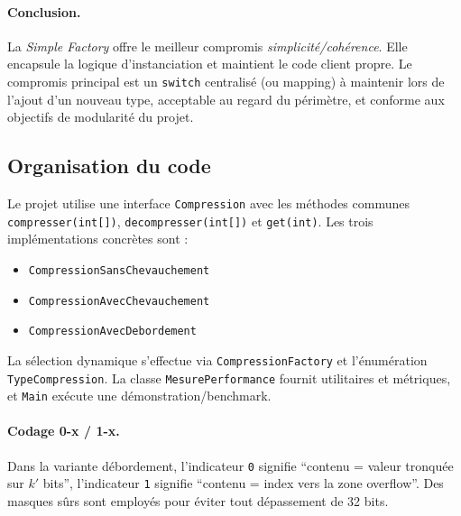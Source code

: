 \paragraph{Conclusion.} La \emph{Simple Factory} offre le meilleur compromis \emph{simplicité/cohérence}. Elle encapsule la logique d'instanciation et maintient le code client propre. Le compromis principal est un \texttt{switch} centralisé (ou mapping) à maintenir lors de l'ajout d'un nouveau type, acceptable au regard du périmètre, et conforme aux objectifs de modularité du projet.

\subsection{Organisation du code}
Le projet utilise une interface \texttt{Compression} avec les méthodes communes \verb|compresser(int[])|, \verb|decompresser(int[])| et \verb|get(int)|. Les trois implémentations concrètes sont :
\begin{itemize}
  \item \texttt{CompressionSansChevauchement}
  \item \texttt{CompressionAvecChevauchement}
  \item \texttt{CompressionAvecDebordement}
\end{itemize}
La sélection dynamique s'effectue via \texttt{CompressionFactory} et l'énumération \texttt{TypeCompression}. La classe \texttt{MesurePerformance} fournit utilitaires et métriques, et \texttt{Main} exécute une démonstration/benchmark.

\paragraph{Codage 0-x / 1-x.} Dans la variante débordement, l'indicateur \texttt{0} signifie ``contenu = valeur tronquée sur $k'$ bits'', l'indicateur \texttt{1} signifie ``contenu = index vers la zone overflow''. Des masques sûrs sont employés pour éviter tout dépassement de 32 bits.


